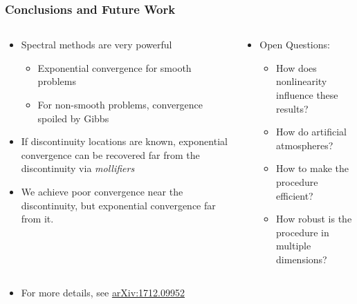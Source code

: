 \documentclass[9pt,usepdftitle=false,aspectratio=169]{beamer}
\newcommand{\backupbegin}{ %
  \newcounter{finalframe}
  \setcounter{finalframe}{\value{framenumber}}
}
\begin{document}
\begin{frame}
  \frametitle{Conclusions and Future Work}
  \begin{columns}
    \begin{column}{.5\textwidth}
      \begin{itemize}
      \item Spectral methods are very powerful
        \begin{itemize}
        \item Exponential convergence for smooth problems
        \item For non-smooth problems, convergence spoiled by Gibbs
        \end{itemize}
      \item If discontinuity locations are known, exponential
        convergence can be recovered far from the discontinuity via
        \textit{mollifiers}
      \item We achieve poor convergence near the discontinuity, but
        exponential convergence far from it.
      \end{itemize}
    \end{column}
    \begin{column}{.5\textwidth}
      \begin{itemize}
      \item Open Questions:
        \begin{itemize}
        \item How does nonlinearity influence these results?
        \item How do artificial atmospheres?
        \item How to make the procedure efficient?
        \item How robust is the procedure in multiple dimensions?
        \end{itemize}
      \end{itemize}
    \end{column}
  \end{columns}
  \vspace{1cm}
  \begin{itemize}
    \item For more details, see
      {\color{blue}\href{https://arxiv.org/abs/1712.09952}{arXiv:1712.09952}}
    \end{itemize}
\end{frame}

\backupbegin
\end{document}
